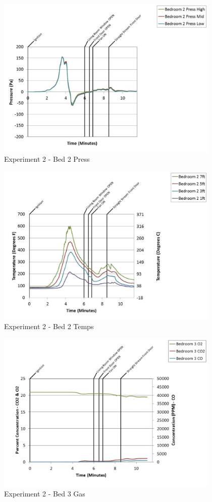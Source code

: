 \documentclass{article}
\begin{document}
\begin{appendices}
	\begin{figure}[h!]
		\centering
		\includegraphics[height=3.05in]{0_Images/Results_Charts/Exp_2_Charts/Bed2Press.pdf}
		\caption{Experiment 2 - Bed 2 Press}
	\end{figure}
 
	\clearpage

	\begin{figure}[h!]
		\centering
		\includegraphics[height=3.05in]{0_Images/Results_Charts/Exp_2_Charts/Bed2Temps.pdf}
		\caption{Experiment 2 - Bed 2 Temps}
	\end{figure}
 

	\begin{figure}[h!]
		\centering
		\includegraphics[height=3.05in]{0_Images/Results_Charts/Exp_2_Charts/Bed3Gas.pdf}
		\caption{Experiment 2 - Bed 3 Gas}
	\end{figure}
 

\end{appendices}
\end{document}
